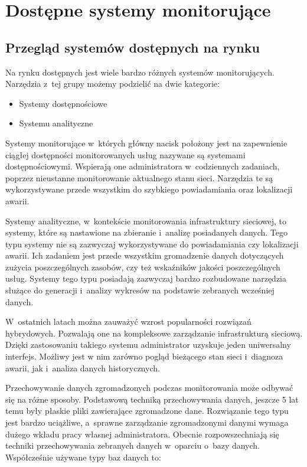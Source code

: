 \chapter{Dostępne systemy monitorujące}
\label{chap:Systemy}

\section[Przegląd systemów][Przegląd systemów dostępnych na rynku]{Przegląd systemów dostępnych na rynku}

Na rynku dostępnych jest wiele bardzo różnych systemów
monitorujących. Narzędzia z~tej grupy możemy podzielić na dwie
kategorie:

\begin{itemize}
\item Systemy dostępnościowe
\item Systemu analityczne
\end{itemize}

Systemy monitorujące w~których główny nacisk położony jest na
zapewnienie ciągłej dostępności monitorowanych usług nazywane są
systemami dostępnościowymi. Wspierają one administratora
w~codziennych zadaniach, poprzez nieustanne monitorowanie aktualnego
stanu sieci. Narzędzia te są wykorzystywane przede wszystkim do
szybkiego powiadamiania oraz lokalizacji awarii.

Systemy analityczne, w~kontekście monitorowania infrastruktury
sieciowej, to systemy, które są nastawione na zbieranie i~analizę
posiadanych danych. Tego typu systemy nie są zazwyczaj wykorzystywane
do powiadamiania czy lokalizacji awarii. Ich zadaniem jest przede
wszystkim gromadzenie danych dotyczących zużycia poszczególnych
zasobów, czy też wskaźników jakości poszczególnych usług. Systemy tego
typu posiadają zazwyczaj bardzo rozbudowane narzędzia służące do
generacji i~analizy wykresów na podstawie zebranych wcześniej danych.

W~ostatnich latach można zauważyć wzrost popularności rozwiązań
hybrydowych. Pozwalają one na kompleksowe zarządzanie infrastrukturą
sieciową. Dzięki zastosowaniu takiego systemu administrator uzyskuje
jeden uniwersalny interfejs. Możliwy jest w nim zarówno pogląd
bieżącego stan sieci i~diagnoza awarii, jak i~analiza danych
historycznych.

Przechowywanie danych zgromadzonych podczas monitorowania może odbywać
się na różne sposoby. Podstawową techniką przechowywania danych,
jeszcze 5 lat temu były płaskie pliki zawierające zgromadzone
dane. Rozwiązanie tego typu jest bardzo uciążliwe, a~sprawne
zarządzanie zgromadzonymi danymi wymaga dużego wkładu pracy własnej
administratora. Obecnie rozpowszechniają się techniki przechowywania
zebranych danych w~oparciu o~bazy danych. Współcześnie używane typy
baz danych to:

